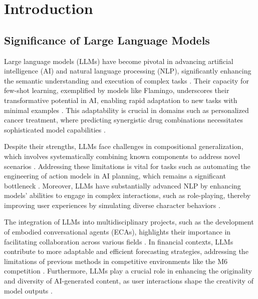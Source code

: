 \section{Introduction} \label{sec:Introduction}


\subsection{Significance of Large Language Models} \label{subsec:Significance of Large Language Models}



Large language models (LLMs) have become pivotal in advancing artificial intelligence (AI) and natural language processing (NLP), significantly enhancing the semantic understanding and execution of complex tasks \cite{ginzburg2021selfsuperviseddocumentsimilarityranking}. Their capacity for few-shot learning, exemplified by models like Flamingo, underscores their transformative potential in AI, enabling rapid adaptation to new tasks with minimal examples \cite{alayrac2022flamingo}. This adaptability is crucial in domains such as personalized cancer treatment, where predicting synergistic drug combinations necessitates sophisticated model capabilities \cite{edwards2023synergptincontextlearningpersonalized}.



Despite their strengths, LLMs face challenges in compositional generalization, which involves systematically combining known components to address novel scenarios \cite{zheng2023layerwiserepresentationfusioncompositional}. Addressing these limitations is vital for tasks such as automating the engineering of action models in AI planning, which remains a significant bottleneck \cite{aineto2024actionmodellearningguarantees}. Moreover, LLMs have substantially advanced NLP by enhancing models' abilities to engage in complex interactions, such as role-playing, thereby improving user experiences by simulating diverse character behaviors \cite{tao2024rolecraftglmadvancingpersonalizedroleplaying}.



The integration of LLMs into multidisciplinary projects, such as the development of embodied conversational agents (ECAs), highlights their importance in facilitating collaboration across various fields \cite{korre2023takesvillagemultidisciplinaritycollaboration}. In financial contexts, LLMs contribute to more adaptable and efficient forecasting strategies, addressing the limitations of previous methods in competitive environments like the M6 competition \cite{stank2024designingtimeseriesmodelshypernetworks}. Furthermore, LLMs play a crucial role in enhancing the originality and diversity of AI-generated content, as user interactions shape the creativity of model outputs \cite{palmini2024patternscreativityuserinput}.



